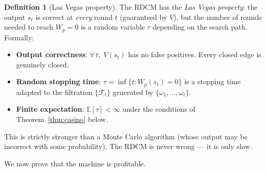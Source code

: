 \documentclass[11pt,a4paper]{article}
\theoremstyle{definition}
\newtheorem{definition}[theorem]{Definition}
\theoremstyle{remark}
\begin{document}
\begin{definition}[Las Vegas property]\label{def:vegas}
The RDCM has the \emph{Las Vegas property}: the output $s_t$ is correct at \emph{every} round $t$ (guaranteed by $V$), but the number of rounds needed to reach $W_p = 0$ is a random variable $\tau$ depending on the search path. Formally:
\begin{itemize}[nosep]
  \item \textbf{Output correctness}: $\forall\, t,\; V(s_t)$ has no false positives. Every closed edge is genuinely closed.
  \item \textbf{Random stopping time}: $\tau = \inf\{t : W_p(s_t) = 0\}$ is a stopping time adapted to the filtration $\{\mathcal{F}_t\}$ generated by $\{\omega_1, \ldots, \omega_t\}$.
  \item \textbf{Finite expectation}: $\mathbb{E}[\tau] < \infty$ under the conditions of Theorem~\ref{thm:casino} below.
\end{itemize}
This is strictly stronger than a Monte Carlo algorithm (whose output may be incorrect with some probability). The RDCM is never wrong --- it is only slow.
\end{definition}

We now prove that the machine is profitable.
\end{document}
